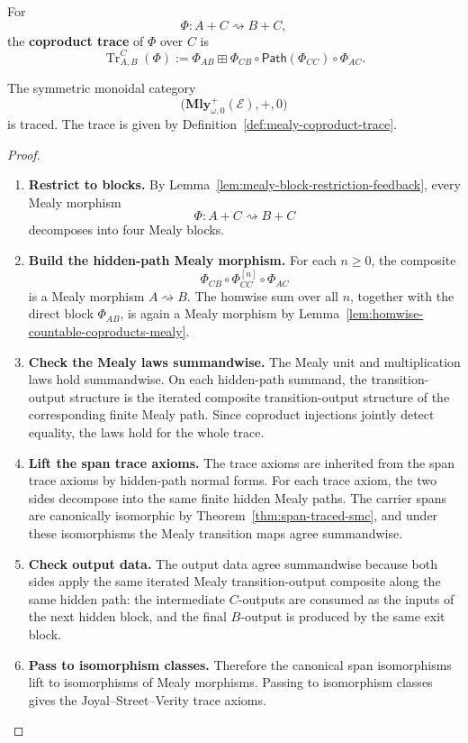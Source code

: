 \begin{definition}
\label{def:mealy-coproduct-trace}
For
\[
  \Phi:A+C\rightsquigarrow B+C,
\]
the \textbf{coproduct trace} of \(\Phi\) over \(C\) is
\[
  \operatorname{Tr}^{C}_{A,B}(\Phi)
  :=
  \Phi_{AB}
  \boxplus
  \Phi_{CB}\circ\mathsf{Path}(\Phi_{CC})\circ\Phi_{AC}.
\]
\end{definition}

\begin{theorem}
\label{thm:mly-traced-smc}
The symmetric monoidal category
\[
  \bigl(\mathbf{Mly}^{+}_{\omega,0}(\mathcal E),+,0\bigr)
\]
is traced. The trace is given by
Definition~\ref{def:mealy-coproduct-trace}.
\end{theorem}

\begin{proof}
\begin{enumerate}
  \item \textbf{Restrict to blocks.}
  By Lemma~\ref{lem:mealy-block-restriction-feedback}, every Mealy morphism
  \[
    \Phi:A+C\rightsquigarrow B+C
  \]
  decomposes into four Mealy blocks.

  \item \textbf{Build the hidden-path Mealy morphism.}
  For each \(n\geq 0\), the composite
  \[
    \Phi_{CB}\circ\Phi_{CC}^{[n]}\circ\Phi_{AC}
  \]
  is a Mealy morphism \(A\rightsquigarrow B\). The homwise sum over all
  \(n\), together with the direct block \(\Phi_{AB}\), is again a Mealy
  morphism by Lemma~\ref{lem:homwise-countable-coproducts-mealy}.

  \item \textbf{Check the Mealy laws summandwise.}
  The Mealy unit and multiplication laws hold summandwise. On each hidden-path
  summand, the transition-output structure is the iterated composite
  transition-output structure of the corresponding finite Mealy path. Since
  coproduct injections jointly detect equality, the laws hold for the whole
  trace.

  \item \textbf{Lift the span trace axioms.}
  The trace axioms are inherited from the span trace axioms by hidden-path
  normal forms. For each trace axiom, the two sides decompose into the same
  finite hidden Mealy paths. The carrier spans are canonically isomorphic by
  Theorem~\ref{thm:span-traced-smc}, and under these isomorphisms the Mealy
  transition maps agree summandwise.

  \item \textbf{Check output data.}
  The output data agree summandwise because both sides apply the same iterated
  Mealy transition-output composite along the same hidden path: the
  intermediate \(C\)-outputs are consumed as the inputs of the next hidden
  block, and the final \(B\)-output is produced by the same exit block.

  \item \textbf{Pass to isomorphism classes.}
  Therefore the canonical span isomorphisms lift to isomorphisms of Mealy
  morphisms. Passing to isomorphism classes gives the Joyal--Street--Verity
  trace axioms.
\end{enumerate}
\end{proof}

